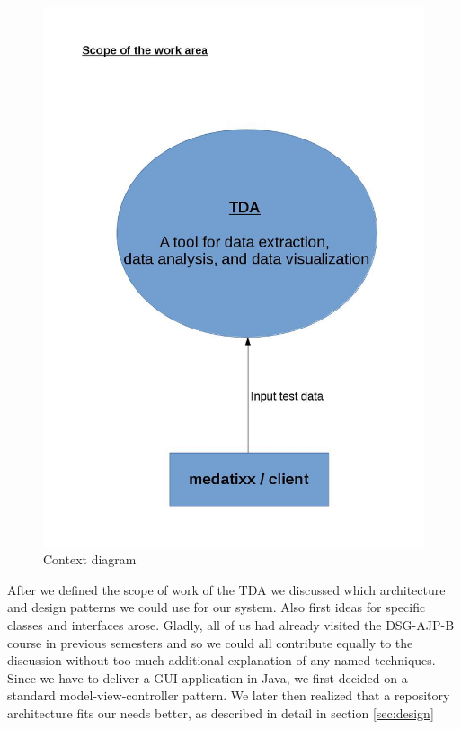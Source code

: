 \begin{figure}[h]
\begin{center}
\includegraphics[scale=0.2]{pics/Scope_of_Work_Context_Diagram_v2.jpg}
\caption{Context diagram} 
\label{Scope}
\end{center}
\end{figure}

After we defined the scope of work of the TDA we discussed which architecture and design patterns we could use for our system. Also first ideas for specific classes and interfaces arose. Gladly, all of us had already visited the DSG-AJP-B course in previous semesters and so we could all contribute equally to the discussion without too much additional explanation of any named techniques. Since we have to deliver a GUI application in Java, we first decided on a standard model-view-controller pattern. We later then realized that a repository architecture fits our needs better, as described in detail in section \ref{sec:design} \\

